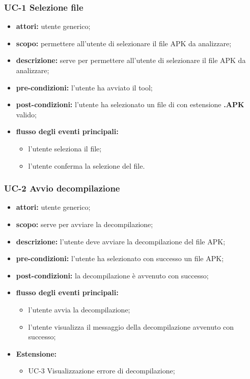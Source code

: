 \subsubsection{UC-1 Selezione file}\label{subsubsec:uc-1-selezione-file}
\begin{itemize}
    \item \textbf{attori:} utente generico;
    \item \textbf{scopo:} permettere all'utente di selezionare il file APK da analizzare;
    \item \textbf{descrizione:} serve per permettere all'utente di selezionare il file APK da analizzare;
    \item \textbf{pre-condizioni:} l'utente ha avviato il tool;
    \item \textbf{post-condizioni:} l'utente ha selezionato un file di con estensione \textbf{.APK} valido;
    \item \textbf{flusso degli eventi principali:}
    \begin{itemize}
        \item l'utente seleziona il file;
        \item l'utente conferma la selezione del file.
    \end{itemize}
\end{itemize}
\subsubsection{UC-2 Avvio decompilazione}\label{subsubsec:uc-2-avvio-decompilazione}
\begin{itemize}
    \item \textbf{attori:} utente generico;
    \item \textbf{scopo:} serve per avviare la decompilazione;
    \item \textbf{descrizione:} l'utente deve avviare la decompilazione del file APK;
    \item \textbf{pre-condizioni:} l'utente ha selezionato con successo un file APK;
    \item \textbf{post-condizioni:} la decompilazione è avvenuto con successo;
    \item \textbf{flusso degli eventi principali:}
    \begin{itemize}
        \item l'utente avvia la decompilazione;
        \item l'utente visualizza il messaggio della decompilazione avvenuto con successo;
    \end{itemize}
    \item \textbf{Estensione:}
    \begin{itemize}
        \item UC-3 Visualizzazione errore di decompilazione;
    \end{itemize}
\end{itemize}

